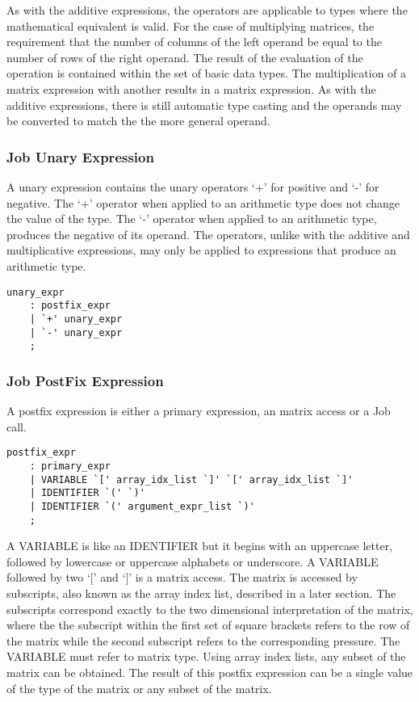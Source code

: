 \documentclass[prodmode,acmtecs]{acmsmall}
\begin{document}
As with the additive expressions, the operators are applicable to types
where the mathematical equivalent is valid. For the case of multiplying
matrices, the requirement that the number of columns of the left operand 
be equal to the number of rows of the right operand. The result of the
evaluation of the operation is contained within the set of basic data 
types. The multiplication of a matrix expression with another results in 
a matrix expression. As with the additive expressions, there is still 
automatic type casting and the operands may be converted to match the
the more general operand. 
\medskip

\subsubsection{Job Unary Expression}
  
A unary expression contains the unary operators `+' for positive and `-' 
for negative. The `+' operator when applied to an arithmetic type does
not change the value of the type. The `-' operator when applied to an
arithmetic type, produces the negative of its operand. The operators, 
unlike with the additive and multiplicative expressions, may only be
applied to expressions that produce an arithmetic type.


\begin{lstlisting}
unary_expr
	: postfix_expr
	| `+' unary_expr
	| `-' unary_expr
	;
\end{lstlisting}
\medskip

\subsubsection{Job PostFix Expression}

A postfix expression is either a primary expression, an matrix access or 
a Job call.

\begin{lstlisting}
postfix_expr
	: primary_expr
	| VARIABLE `[' array_idx_list `]' `[' array_idx_list `]'
	| IDENTIFIER `(' `)'
	| IDENTIFIER `(' argument_expr_list `)'
	;
\end{lstlisting}

A VARIABLE is like an IDENTIFIER but it begins with an uppercase letter,
followed by lowercase or uppercase alphabets or underscore. A VARIABLE
followed by two `[' and `]' is a matrix access. The matrix is accessed
by subscripts, also known as the array index list, described in a later
section. The subscripts correspond exactly to the two dimensional 
interpretation of the matrix, where the the subscript within the first 
set of square brackets refers to the row of the matrix while the second
subscript refers to the corresponding pressure. The VARIABLE must refer 
to matrix type. Using array index lists, any subset of the matrix can be
obtained. The result of this postfix expression can be a single value of
the type of the matrix or any subset of the matrix.
\end{document}
